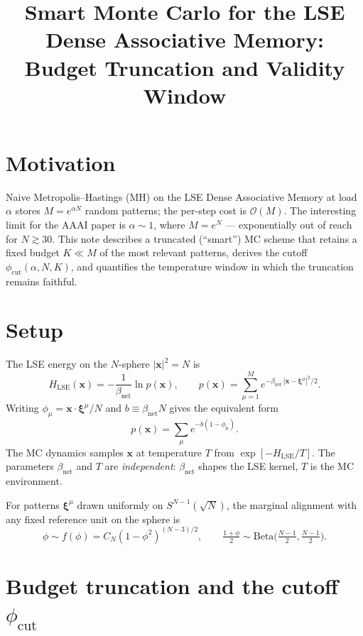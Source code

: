 \documentclass[11pt]{article}
\title{Smart Monte Carlo for the LSE Dense Associative Memory:\\
Budget Truncation and Validity Window}
\author{}
\date{}
\newcommand{\bxi}{\boldsymbol{\xi}}
\newcommand{\bx}{\mathbf{x}}
\newcommand{\Pcut}{\phi_{\mathrm{cut}}}
\begin{document}
\maketitle

\section{Motivation}

Naive Metropolis--Hastings (MH) on the LSE Dense Associative Memory at load $\alpha$ stores $M = e^{\alpha N}$ random patterns; the per-step cost is $\mathcal{O}(M)$. The interesting limit for the AAAI paper is $\alpha \sim 1$, where $M = e^N$ — exponentially out of reach for $N \gtrsim 30$. This note describes a truncated (``smart'') MC scheme that retains a fixed budget $K \ll M$ of the most relevant patterns, derives the cutoff $\Pcut(\alpha, N, K)$, and quantifies the temperature window in which the truncation remains faithful.

\section{Setup}

The LSE energy on the $N$-sphere $\lvert\bx\rvert^2 = N$ is
\begin{equation}
H_{\mathrm{LSE}}(\bx) = -\frac{1}{\beta_{\mathrm{net}}}\ln p(\bx),
\qquad p(\bx) = \sum_{\mu=1}^M e^{-\beta_{\mathrm{net}}\, |\bx-\bxi^\mu|^2/2}.
\label{eq:Hdef}
\end{equation}
Writing $\phi_\mu = \bx\!\cdot\!\bxi^\mu / N$ and $b \equiv \beta_{\mathrm{net}} N$ gives the equivalent form
\begin{equation}
p(\bx) = \sum_\mu e^{-b(1-\phi_\mu)}.
\label{eq:pphi}
\end{equation}
The MC dynamics samples $\bx$ at temperature $T$ from $\exp[-H_{\mathrm{LSE}}/T]$. The parameters $\beta_{\mathrm{net}}$ and $T$ are \emph{independent}: $\beta_{\mathrm{net}}$ shapes the LSE kernel, $T$ is the MC environment.

For patterns $\bxi^\mu$ drawn uniformly on $S^{N-1}(\sqrt{N})$, the marginal alignment with any fixed reference unit on the sphere is
\begin{equation}
\phi \sim f(\phi) = C_N(1-\phi^2)^{(N-3)/2},
\qquad
\tfrac{1+\phi}{2}\sim\mathrm{Beta}\!\big(\tfrac{N-1}{2},\tfrac{N-1}{2}\big).
\label{eq:fphi}
\end{equation}

\section{Budget truncation and the cutoff $\Pcut$}
\end{document}
